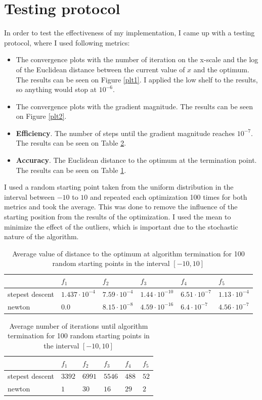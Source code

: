 \documentclass[a4paper]{article}
\begin{document}
\section{Testing protocol}
In order to test the effectiveness of my implementation, I came up with a
testing protocol, where I used following metrics:
\begin{itemize}
\item The convergence plots with the number of iteration on the x-scale and the
  log of the Euclidean distance between the current value of $x$ and the
  optimum. The results can be seen on Figure \ref{plt1}. I applied the low shelf
  to the results, so anything would stop at $10^{-6}$.
\item The convergence plots with the gradient magnitude.
  The results can be seen on Figure \ref{plt2}. 
\item \textbf{Efficiency}. The number of steps until the gradient magnitude reaches $10^{-7}$. The
  results can be seen on Table \ref{table2}.
\item \textbf{Accuracy}. The Euclidean distance to the optimum at the
  termination point. The results can be seen on Table \ref{table1}.
\end{itemize}
I used a random starting point taken from the uniform distribution in the
interval between $-10$ to $10$ and repeated each optimization 100 times for both
metrics and took the average. This was done to remove the influence of the
starting position from the results of the optimization. I used the mean 
to minimize the effect of the outliers,
which is important due to the stochastic nature of the algorithm. 
\begin{table}[]
\centering
\begin{tabular}{|l|l|l|l|l|l|}
\hline
                 & $f_1$         & $f_2$         & $f_3$       & $f_4$       & $f_5$       \\ \hline
stepest descent & $1.437\cdot10^{-4}$ & $7.59\cdot10^{-4}$ & $1.44\cdot10^{-10}$ & $6.51\cdot10^{-7}$ & $1.13\cdot 10^{-4}$ \\ \hline
newton           & $0.0$      & $8.15\cdot10^{-8}$ & $4.59\cdot10^{-16}$ & $6.4\cdot10^{-7}$  & $4.56\cdot10^{-7}$ \\ \hline
\end{tabular}
\caption{Average value of distance to the optimum at algorithm termination for 100 random starting points in the interval $[-10,10]$}
\label{table1}
\end{table}

\begin{table}[]
\centering
\begin{tabular}{|l|l|l|l|l|l|}
\hline
                 & $f_1$ & $f_2$   & $f_3$  & $f_4$  & $f_5$ \\ \hline
stepest descent & $3392$ & $6991$ & $5546$ & $488$ & $52$ \\ \hline
newton           & $1$  & $30$   & $16$  & $29$  & $2 $ \\ \hline
\end{tabular}
\caption{Average number of iterations until algorithm termination for 100 random starting points in the interval $[-10,10]$}
\label{table2}
\end{table}
\end{document}
